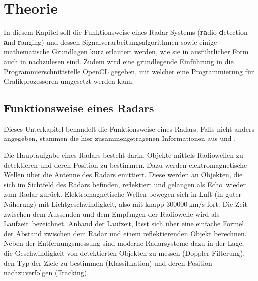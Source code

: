 \documentclass[a4paper,12pt,oneside,german,toc=bibliography]{scrbook}
\theoremstyle{definition}
\theoremstyle{plain}
\numberwithin{equation}{section}
\begin{document}


\tableofcontents






\chapter{Theorie}

In diesem Kapitel soll die Funktionsweise eines Radar-Systems (\textbf{ra}dio \textbf{d}etection \textbf{a}nd \textbf{r}anging) und dessen Signalverarbeitungsalgorithmen sowie einige mathematische Grundlagen kurz erläutert werden, wie sie in ausführlicher Form auch in \cites{Richards,RSH,Ludloff} nachzulesen sind. Zudem wird eine grundlegende Einführung in die Programmierschnittstelle OpenCL gegeben, mit welcher eine Programmierung für Grafikprozessoren umgesetzt werden kann.

\section{Funktionsweise eines Radars} 

Dieses Unterkapitel behandelt die Funktionsweise eines Radars. Falls nicht anders angegeben, stammen die hier zusammengetragenen Informationen aus \cite[Kapitel 1\&{}2]{Richards} und \cite[Kapitel 1]{Ludloff}.

Die Hauptaufgabe eines Radars besteht darin, Objekte mittels Radiowellen zu detektieren und deren Position zu bestimmen. Dazu werden elektromagnetische Wellen über die Antenne des Radars emittiert. Diese werden an Objekten, die sich im Sichtfeld des Radars befinden, reflektiert und gelangen als \glqq  Echo\grqq ~wieder zum Radar zurück. Elektromagnetische Wellen bewegen sich in Luft (in guter Näherung) mit Lichtgeschwindigkeit, also mit knapp $ 300000 ~\text{km/s} $ fort. Die Zeit zwischen dem Aussenden und dem Empfangen der Radiowelle wird als \glqq Laufzeit\grqq ~bezeichnet. Anhand der Laufzeit, lässt sich über eine einfache Formel der Abstand zwischen dem Radar und einem reflektierenden Objekt berechnen. Neben der Entfernungsmessung sind moderne Radarsysteme dazu in der Lage, die Geschwindigkeit von detektierten Objekten zu messen (Doppler-Filterung), den Typ der Ziele zu bestimmen (Klassifikation) und deren Position nachzuverfolgen (Tracking).
\end{document}
